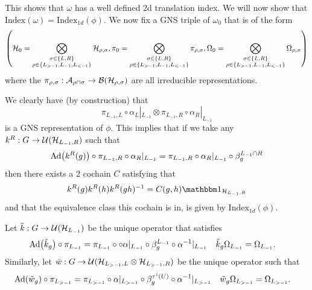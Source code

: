 \documentclass[12pt,a4paper,twoside]{article}
\numberwithin{equation}{section}
\begin{document}
This shows that $\omega$ has a well defined 2d translation index. We will now show that $\textrm{Index}(\omega)=\textrm{Index}_{1d}(\phi)$. We now fix a GNS triple of $\omega_0$ that is of the form
\begin{equation}
	\left(\HH_0=\bigotimes_{\substack{\sigma\in\{L,R\}\\ \rho\in\{L_{>-1},L_{-1},L_{<-1}\}}}\HH_{\rho,\sigma},\pi_0=\bigotimes_{\substack{\sigma\in\{L,R\}\\ \rho\in\{L_{>-1},L_{-1},L_{<-1}\}}}\pi_{\rho,\sigma},\Omega_0=\bigotimes_{\substack{\sigma\in\{L,R\}\\ \rho\in\{L_{>-1},L_{-1},L_{<-1}\}}}\Omega_{\rho,\sigma}\right)
\end{equation}
where the $\pi_{\rho,\sigma}:\mathcal A_{\rho\cap\sigma}\rightarrow\mathcal B(\mathcal H_{\rho,\sigma})$ are all irreducible representations.
\begin{remark}\label{rem:GNS_One_Dimensional}
	We clearly have (by construction) that
	\begin{equation}
		\pi_{L_{-1},L}\circ\alpha_L|_{L_{-1}}\otimes \pi_{L_{-1},R}\circ\alpha_R|_{L_{-1}}
	\end{equation}
	is a GNS representation of $\phi$. This implies that if we take any $k^R:G\rightarrow \mathcal U(\mathcal H_{L_{-1},R})$ such that
	\begin{equation}
		\Ad{k^R(g)}\circ\pi_{L_{-1},R}\circ\alpha_R|_{L_{-1}}=\pi_{L_{-1},R}\circ\alpha_R|_{L_{-1}}\circ\beta_{g}^{L_{-1}\cap R}
	\end{equation}
	then there exists a 2 cochain $C$ satisfying that
	\begin{equation}
		k^R(g)k^R(h)k^R(gh)^{-1}=C(g,h)\id_{\HH_{L_{-1},R}}
	\end{equation}
	and that the equivalence class this cochain is in, is given by $\textrm{Index}_{1d}(\phi)$.
\end{remark}
Let $\tilde k:G\rightarrow \mathcal U(\mathcal H_{L_{-1}})$ be the unique operator that satisfies
\begin{align}
	\Ad{\tilde{k}_g}\circ\pi_{L_{-1}}&=\pi_{L_{-1}}\circ \circ\alpha|_{L_{-1}}\circ\beta_g^{L_{-1}}\circ \alpha^{-1}|_{L_{-1}}&\tilde k_g\Omega_{L_{-1}}&=\Omega_{L_{-1}}.
\end{align}
Similarly, let $\tilde{w}:G\rightarrow\mathcal U(\mathcal H_{L_{>-1},L}\otimes\mathcal H_{L_{>-1},R})$ be the unique operator such that
\begin{align}
	\Ad{\tilde w_{g}}\circ\pi_{L_{>-1}}&=\pi_{L_{>-1}}\circ\alpha|_{L_{>-1}}\circ\beta_g^{\tau^{i}(U)}\circ \alpha^{-1}|_{L_{>-1}}&\tilde w_{g}\Omega_{L_{>-1}}&=\Omega_{L_{>-1}}.
\end{align}
\end{document}
